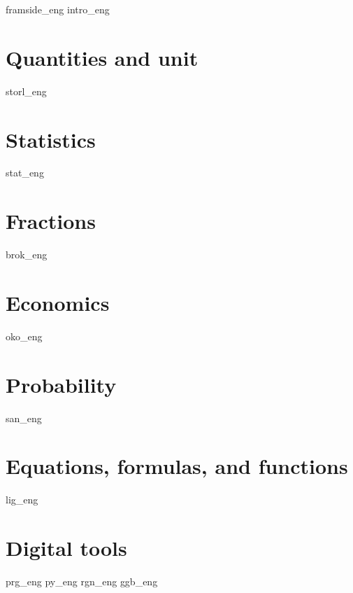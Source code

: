 



\usepackage[angle=0, color={[rgb]{1,0,0}}, scale = 0.075, vpos = 20pt]{draftwatermark}





{framside_eng}
{intro_eng}
\newpage
\tableofcontents

\chapter{Quantities and unit \label{Storlogenh}}
\newpage

{storl_eng}

\chapter{Statistics \label{Statistikk}}
\newpage
{stat_eng}

\chapter{Fractions \label{BrokAM}}
\newpage
{brok_eng}
\newpage

\chapter{Economics \label{Okonomi}}
\newpage
{oko_eng}

\chapter{Probability \label{Sannsyn}} 
\newpage
{san_eng}

\chapter{Equations, formulas, and functions \label{LigningerAM}}
\newpage
{lig_eng}

\chapter{Digital tools \label{Dig}}
{prg_eng}
{py_eng}
{rgn_eng}	
{ggb_eng}	

